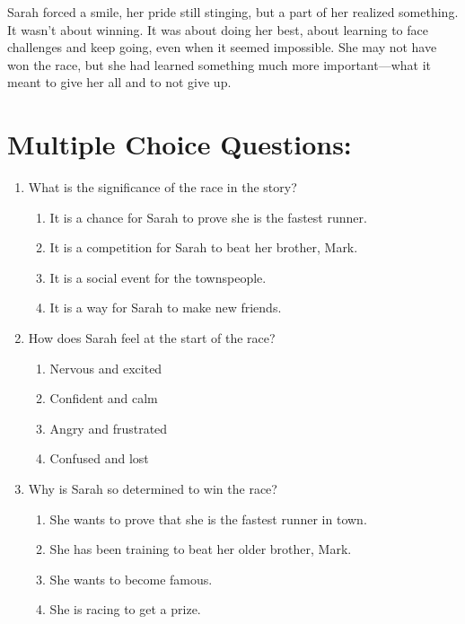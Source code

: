 \documentclass[12pt]{article}
\begin{document}
Sarah forced a smile, her pride still stinging, but a part of her realized something. It wasn’t about winning. It was about doing her best, about learning to face challenges and keep going, even when it seemed impossible. She may not have won the race, but she had learned something much more important—what it meant to give her all and to not give up.

\newpage

\section*{Multiple Choice Questions:}

\begin{enumerate}

\item What is the significance of the race in the story?
\begin{enumerate}[label=\Alph*.]
    \item It is a chance for Sarah to prove she is the fastest runner.
    \item It is a competition for Sarah to beat her brother, Mark.
    \item It is a social event for the townspeople.
    \item It is a way for Sarah to make new friends.
\end{enumerate}

\vspace{0.5cm}

\item How does Sarah feel at the start of the race?
\begin{enumerate}[label=\Alph*.]
    \item Nervous and excited
    \item Confident and calm
    \item Angry and frustrated
    \item Confused and lost
\end{enumerate}

\vspace{0.5cm}

\item Why is Sarah so determined to win the race?
\begin{enumerate}[label=\Alph*.]
    \item She wants to prove that she is the fastest runner in town.
    \item She has been training to beat her older brother, Mark.
    \item She wants to become famous.
    \item She is racing to get a prize.
\end{enumerate}


\end{enumerate}
\end{document}
